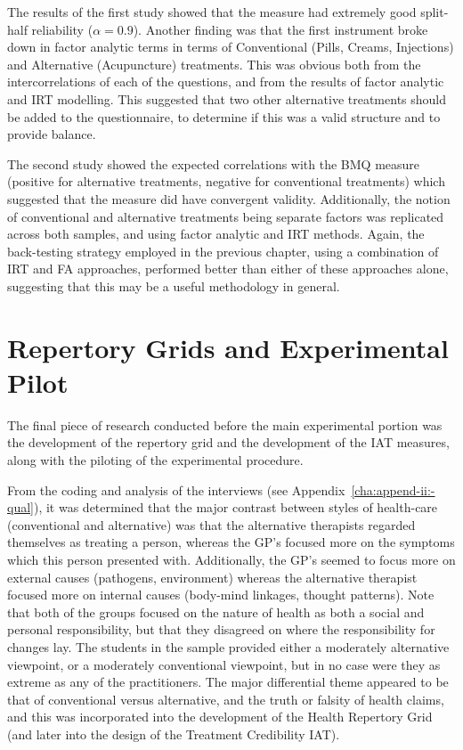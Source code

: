 The results of the first study showed that the measure had extremely
good split-half reliability ($ \alpha=0.9$). Another finding was that
the first instrument broke down in factor analytic terms in terms of
Conventional (Pills, Creams, Injections) and Alternative (Acupuncture)
treatments. This was obvious both from the intercorrelations of each
of the questions, and from the results of factor analytic and IRT
modelling. This suggested that two other alternative treatments should
be added to the questionnaire, to determine if this was a valid
structure and to provide balance.

The second study showed the expected correlations with the BMQ measure
(positive for alternative treatments, negative for conventional
treatments) which suggested that the measure did have convergent
validity. Additionally, the notion of conventional and alternative
treatments being separate factors was replicated across both samples,
and using factor analytic and IRT methods. Again, the back-testing
strategy employed in the previous chapter, using a combination of IRT
and FA approaches, performed better than either of these approaches
alone, suggesting that this may be a useful methodology in general.


\section{Repertory Grids and Experimental Pilot}
\label{sec:qual-rese-rep}

The final piece of research conducted before the main experimental
portion was the development of the repertory grid and the development
of the IAT measures, along with the piloting of the
experimental procedure.

From the coding and analysis of the interviews (see Appendix~\ref{cha:append-ii:-qual}), it was
determined that the major contrast between styles of health-care
(conventional and alternative) was that the alternative therapists
regarded themselves as treating a person, whereas the GP's focused
more on the symptoms which this person presented with. Additionally,
the GP's seemed to focus more on external causes (pathogens,
environment) whereas the alternative therapist focused more on
internal causes (body-mind linkages, thought patterns). Note that both
of the groups focused on the nature of health as both a social and
personal responsibility, but that they disagreed on where the
responsibility for changes lay. The students in the sample provided
either a moderately alternative viewpoint, or a moderately
conventional viewpoint, but in no case were they as extreme as any of
the practitioners. The major differential theme appeared to be that of
conventional versus alternative, and the truth or falsity of health
claims, and this was incorporated into the development of the Health
Repertory Grid (and later into the design of the Treatment Credibility
IAT).

